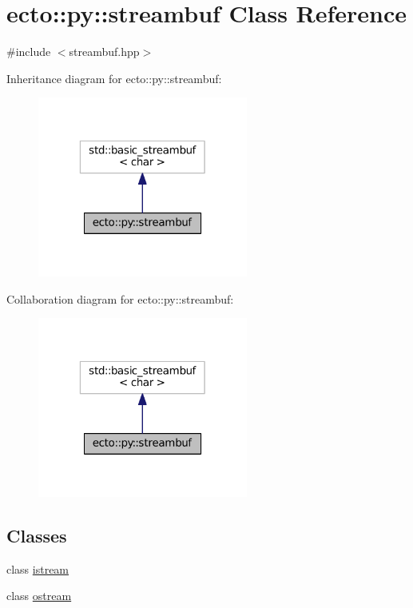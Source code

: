 \hypertarget{classecto_1_1py_1_1streambuf}{\section{ecto\-:\-:py\-:\-:streambuf Class Reference}
\label{classecto_1_1py_1_1streambuf}
}


{\ttfamily \#include $<$streambuf.\-hpp$>$}



Inheritance diagram for ecto\-:\-:py\-:\-:streambuf\-:\nopagebreak
\begin{figure}[H]
\begin{center}
\leavevmode
\includegraphics[width=196pt]{classecto_1_1py_1_1streambuf__inherit__graph}
\end{center}
\end{figure}


Collaboration diagram for ecto\-:\-:py\-:\-:streambuf\-:\nopagebreak
\begin{figure}[H]
\begin{center}
\leavevmode
\includegraphics[width=196pt]{classecto_1_1py_1_1streambuf__coll__graph}
\end{center}
\end{figure}
\subsection*{Classes}
\begin{DoxyCompactItemize}
\item 
class \hyperlink{classecto_1_1py_1_1streambuf_1_1istream}{istream}
\item 
class \hyperlink{classecto_1_1py_1_1streambuf_1_1ostream}{ostream}
\end{DoxyCompactItemize}
